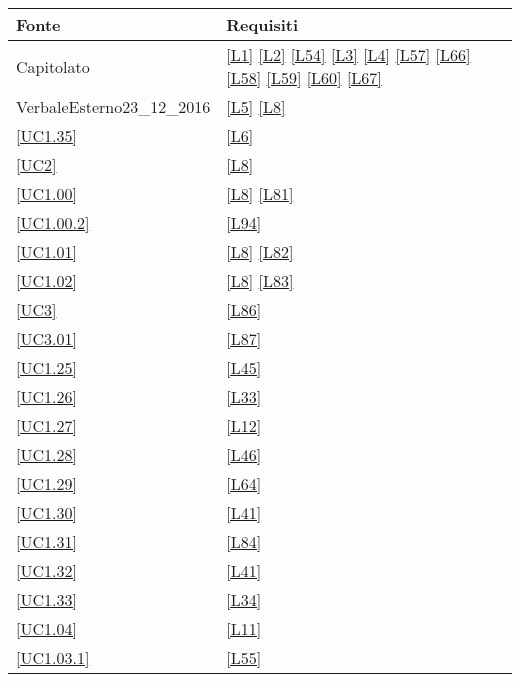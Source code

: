 \begin{longtable}{|P{6cm}|P{6cm}|}
	\hline \textbf{Fonte} & \textbf{Requisiti}\\
	\hline Capitolato & \ref{L1} \linebreak \ref{L2} \linebreak \ref{L54} \linebreak \ref{L3} \linebreak \ref{L4}  \linebreak \ref{L57} \linebreak \ref{L66} \linebreak \ref{L58} \linebreak \ref{L59} \linebreak \ref{L60} \linebreak \ref{L67}\\
	\hline VerbaleEsterno23\_12\_2016 & \ref{L5} \linebreak \ref{L8} \\
	\hline \ref{UC1.35} & \ref{L6} \\
	\hline \ref{UC2} & \ref{L8} \\
	\hline \ref{UC1.00} & \ref{L8} \linebreak \ref{L81} \\
	\hline \ref{UC1.00.2} & \ref{L94} \\
	\hline \ref{UC1.01} & \ref{L8} \linebreak \ref{L82} \\
	\hline \ref{UC1.02} & \ref{L8} \linebreak \ref{L83} \\
	\hline \ref{UC3} & \ref{L86} \\
	\hline \ref{UC3.01} & \ref{L87} \\
	\hline \ref{UC1.25} & \ref{L45} \\
	\hline \ref{UC1.26} & \ref{L33} \\
	\hline \ref{UC1.27} & \ref{L12} \\
	\hline \ref{UC1.28} & \ref{L46} \\
	\hline \ref{UC1.29} & \ref{L64} \\
	\hline \ref{UC1.30} & \ref{L41} \\
	\hline \ref{UC1.31} & \ref{L84} \\
	\hline \ref{UC1.32} & \ref{L41} \\
	\hline \ref{UC1.33} & \ref{L34} \\
	\hline \ref{UC1.04} & \ref{L11} \\
	\hline \ref{UC1.03.1} & \ref{L55} \\

\end{longtable}
